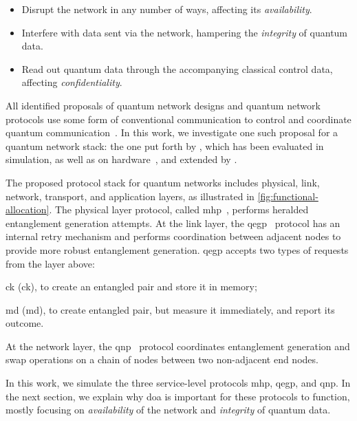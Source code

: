 \begin{itemize}
    \item Disrupt the network in any number of ways, affecting its \emph{availability}.
    \item Interfere with data sent via the network, hampering the \emph{integrity} of quantum data.
    \item Read out quantum data through the accompanying classical control data, affecting
          \emph{confidentiality}.
\end{itemize}

All identified proposals of quantum network designs and quantum network protocols use some form of
conventional communication to control and coordinate quantum
communication~\cite{van_meter_2013_repeaters, schoute_2016_shortcuts, joshi_2020_trusted,
pirker_2019_quantum, kozlowski_2019_towards, dahlberg_2019_egp, kozlowski_2020_qnp}. In this work,
we investigate one such proposal for a quantum network stack: the one put forth by
\textcite{dahlberg_2019_egp}, which has been evaluated in simulation, as well as on
hardware~\cite{pompili_2022_experimental}, and extended by \textcite{kozlowski_2020_qnp}.

The proposed protocol stack for quantum networks includes physical, link, network, transport, and
application layers, as illustrated in \cref{fig:functional-allocation}. The physical layer protocol,
called \acrfull{mhp}~\cite{dahlberg_2019_egp}, performs heralded entanglement generation attempts.
At the link layer, the \acrfull{qegp}~\cite{dahlberg_2019_egp} protocol has an internal retry
mechanism and performs coordination between adjacent nodes to provide more robust entanglement
generation. \acrshort{qegp} accepts two types of requests from the layer above:
%
\begin{inlinelist}
    \item \acrlong{ck} (\acrshort{ck}), to create an entangled pair and store it in memory;
    \item \acrlong{md} (\acrshort{md}), to create entangled pair, but measure it immediately, and
          report its outcome.
\end{inlinelist}
At the network layer, the \acrfull{qnp}~\cite{kozlowski_2020_qnp} protocol coordinates
entanglement generation and swap operations on a chain of nodes between two non-adjacent end nodes.

In this work, we simulate the three service-level protocols \acrshort{mhp}, \acrshort{qegp}, and
\acrshort{qnp}. In the next section, we explain why \acrfull{doa} is important for these protocols
to function, mostly focusing on \emph{availability} of the network and \emph{integrity} of quantum
data.

